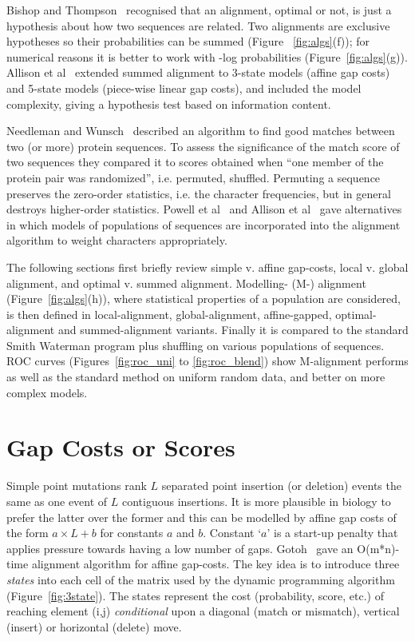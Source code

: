 \documentclass[letterpaper,11pt,oneside]{article}
\begin{document}
Bishop and Thompson~\cite{bishop86} recognised that an alignment, optimal or not,
is just a hypothesis about how two sequences are related.
Two alignments are exclusive hypotheses so their probabilities
can be summed (Figure ~\ref{fig:algs}(f));
for numerical reasons it is better to work with -log probabilities (Figure~\ref{fig:algs}(g)).
Allison et al~\cite{allison92a} extended summed alignment to
3-state models (affine gap costs) and
5-state models (piece-wise linear gap costs),
and included the model complexity,
giving a hypothesis test based on information content.

Needleman and Wunsch~\cite{needleman70} described an algorithm to find good matches between
two (or more) protein sequences.
To assess the significance of the match score of two sequences
they compared it to scores obtained
when ``one member of the protein pair was randomized'', i.e. permuted, shuffled.
Permuting a sequence preserves the zero-order statistics,
i.e. the character frequencies, but
in general destroys higher-order statistics.
Powell et al~\cite{powell98b} and Allison et al~\cite{allison99} gave alternatives in which models
of populations of sequences are incorporated into the alignment algorithm
to weight characters appropriately.

The following sections first briefly review
simple v. affine gap-costs,
local v. global alignment, and
optimal v. summed alignment.
Modelling- (M-) alignment (Figure~\ref{fig:algs}(h)), where statistical properties of a
population are considered, is then defined in
local-alignment, global-alignment, affine-gapped, optimal-alignment and summed-alignment variants.
Finally it is compared to the standard Smith Waterman program plus shuffling
on various populations of sequences.
ROC curves (Figures~\ref{fig:roc_uni} to \ref{fig:roc_blend})
show M-alignment performs as well as the standard method on uniform 
random data, and better on more complex models.




\section{Gap Costs or Scores}

Simple point mutations rank $L$ separated point insertion (or deletion) events
the same as one event of $L$ contiguous insertions.
It is more plausible in biology to prefer the latter over the former and
this can be modelled by affine gap costs of the form $a \times L+b$ for
constants $a$ and $b$.
Constant `$a$' is a start-up penalty that applies pressure towards having
a low number of gaps.
Gotoh~\cite{gotoh82} gave an O(m*n)-time alignment algorithm for affine gap-costs.
The key idea is to introduce three {\em states} into  each cell of
the matrix used by the dynamic programming algorithm (Figure~\ref{fig:3state}).
The states represent the cost (probability, score, etc.) of reaching
element (i,j) {\em conditional} upon a
diagonal (match or mismatch), vertical (insert) or horizontal (delete) move.
\end{document}
